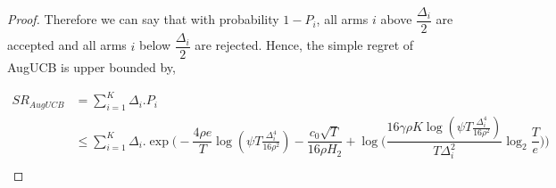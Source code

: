 \begin{proof}


Therefore we can say that with probability $1-P_{i}$, all arms $i$ above $\dfrac{\Delta_{i}}{2}$ are accepted and all arms $i$ below $\dfrac{\Delta_{i}}{2}$ are rejected. Hence, the simple regret of AugUCB is upper bounded by,

\begin{align*}
SR_{AugUCB} &= \sum_{i=1}^{K} \Delta_{i}. P_{i}\\
& \leq \sum_{i=1}^{K} \Delta_{i}. \exp\bigg(-\dfrac{4\rho e}{T}\log (\psi T\frac{\Delta_{i}^{4}}{16\rho^{2}})-\dfrac{c_{0}\sqrt{T}}{16\rho H_{2}} + \log \big( \dfrac{16\gamma\rho K\log (\psi T \frac{\Delta_{i}^{4}}{16\rho^{2}})}{T\Delta_{i}^{2}}\log_{2}\dfrac{T}{e} \big) \bigg) \\
\end{align*}


\end{proof}
